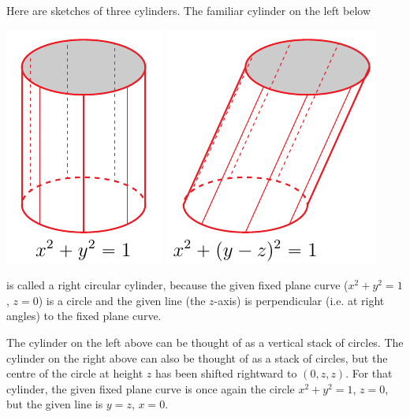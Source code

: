\begin{eg}\label{eg cylinders}
Here are sketches of three cylinders.
The familiar cylinder on the left below
\begin{efig}
\begin{center}
   \includegraphics{cylinderR.pdf}\qquad
   \includegraphics{cylinderO.pdf}
\end{center}
\end{efig}
is called a right circular cylinder, because the given fixed plane curve
($x^2+y^2=1$, $z=0$)
is a circle and the given line (the $z$-axis) is perpendicular 
(i.e. at right angles) to the fixed plane curve.

The cylinder on the left above can be thought of as a vertical stack of 
circles. The cylinder on the right above can also be thought of as a stack 
of circles, but the centre of the circle at height $z$ has been shifted
rightward to $(0,z,z)$. For that cylinder, the given fixed plane curve 
is once again the circle $x^2+y^2=1$, $z=0$, but the given line is $y=z$, $x=0$.


\end{eg}
